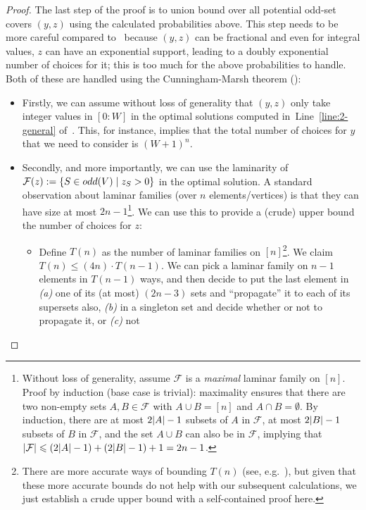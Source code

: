 \documentclass{theoretics}
\renewcommand{\leq}{\leqslant}
\DeclarePairedDelimiter{\card}{\vert}{\vert}
\DeclarePairedDelimiter{\set}{\{}{\}}
\begin{document}
\begin{proof}
	 The last step of the proof is to union bound over all potential odd-set covers $(y,z)$ using the calculated probabilities above. 
	This step needs to be more careful compared to~ because $(y,z)$ can be fractional and even for integral values, $z$ can have  an exponential support, leading to a doubly exponential number of choices for it; this 
	is too much for the above probabilities to handle. Both of these are handled using the Cunningham-Marsh theorem (): 
		
	\begin{itemize}[leftmargin=10pt]
		\item Firstly, we can assume without loss of generality that $(y,z)$ only take integer values in $[0:W]$ in the optimal solutions computed in~Line~\eqref{line:2-general} of~. 
		This, for instance, implies that the total number of choices for $y$ that we need to consider is $(W+1)^{n}$. 
		\item Secondly, and more importantly, we can use the laminarity of $\mathcal{F}(z) := \set{S \in odd(V) \mid z_S > 0}$ in the optimal solution. 
		A standard observation about 
		laminar families (over $n$ elements/vertices) is that they can have size at most $2n-1$\footnote{Without loss of generality, assume $\mathcal{F}$ is a \emph{maximal} laminar family on $[n]$. 
		Proof by induction (base case is trivial): 
		maximality ensures that there are two non-empty sets $A,B \in \mathcal{F}$ with $A \cup B = [n]$ and $A \cap B = \emptyset$. By induction, there are at most $2\card{A}-1$ subsets of $A$ in $\mathcal{F}$, at most $2\card{B}-1$ subsets of $B$ in $\mathcal{F}$, 
		and the set $A \cup B$ can also be in $\mathcal{F}$, implying that $\card{\mathcal{F}} \leq (2\card{A}-1) + (2\card{B}-1) + 1 = 2n-1$.}. We can use this to provide a  (crude) upper bound
		the number of choices for $z$:
		\begin{itemize}
			\item Define $T(n)$ as the number of laminar families on $[n]$\footnote{There are more accurate ways of bounding $T(n)$ (see, e.g.~\cite{Bui-XuanHR12}), but given
			that these more accurate bounds do not help with our subsequent calculations, we just establish a crude upper bound with a self-contained proof here.}. We claim $T(n) \leq (4n) \cdot T(n-1)$. We can pick a laminar family on $n-1$ elements
			in $T(n-1)$ ways, and then decide to put the last element in \emph{(a)} one of its (at most) $(2n-3)$ sets and ``propagate'' it to each of its supersets also, \emph{(b)} in a singleton set and decide whether or not to propagate it, or \emph{(c)} not 

\end{itemize}
\end{itemize}
\end{proof}
\end{document}
